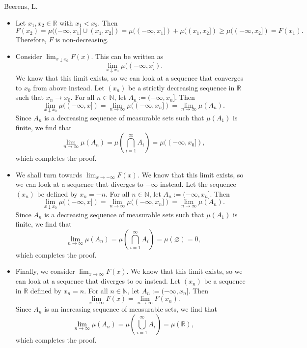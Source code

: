 \begin{solution}[3.11]{Beerens, L.}
    \begin{itemize}
        \item Let $x_1,x_2\in\mathbb{R}$ with $x_1<x_2$. Then
        $$
            F(x_2) = \mu((-\infty,x_1]\cup (x_1,x_2]) = \mu((-\infty, x_1]) + \mu((x_1,x_2])\geq\mu((-\infty, x_2]) = F(x_1).
        $$
        Therefore, $F$ is non-decreasing.
        
        \item Consider $\lim_{x\downarrow x_0}F(x)$. This can be written as 
        $$
            \lim_{x\downarrow x_0}\mu((-\infty,x]).
        $$
        We know that this limit exists, so we can look at a sequence that converges to $x_0$ from above instead. Let $(x_n)$ be a strictly decreasing sequence in $\mathbb{R}$ such that $x_n\rightarrow x_0$. For all $n\in\mathbb{N}$, let $A_n:=(-\infty,x_n]$. Then
        $$
            \lim_{x\downarrow x_0}\mu((-\infty,x]) = \lim_{n\rightarrow \infty}\mu((-\infty,x_n]) = \lim_{n\rightarrow \infty}\mu(A_n).
        $$
        Since $A_n$ is a decreasing sequence of measurable sets such that $\mu(A_1)$ is finite, we find that
        $$
            \lim_{n\rightarrow \infty}\mu(A_n) = \mu\left( \bigcap_{i=1}^\infty A_i \right) = \mu((-\infty, x_0]),
        $$
        which completes the proof.
        
        \item We shall turn towards $\lim_{x\rightarrow -\infty}F(x)$. We know that this limit exists, so we can look at a sequence that diverges to $-\infty$ instead. Let the sequence $(x_n)$ be defined by $x_n = -n$. For all $n\in\mathbb{N}$, let $A_n:=(-\infty,x_n]$. Then
        $$
            \lim_{x\downarrow x_0}\mu((-\infty,x]) = \lim_{n\rightarrow \infty}\mu((-\infty,x_n]) = \lim_{n\rightarrow \infty}\mu(A_n).
        $$
        Since $A_n$ is a decreasing sequence of measurable sets such that $\mu(A_1)$ is finite, we find that
        $$
            \lim_{n\rightarrow \infty}\mu(A_n) = \mu\left( \bigcap_{i=1}^\infty A_i \right) = \mu(\varnothing) = 0,
        $$
        which completes the proof.
        
        \item Finally, we consider $\lim_{x\rightarrow \infty}F(x)$. We know that this limit exists, so we can look at a sequence that diverges to $\infty$ instead. Let $(x_n)$ be a sequence in $\mathbb{R}$ defined by $x_n = n$. For all $n\in\mathbb{N}$, let $A_n:=(-\infty,x_n]$. Then
        $$
            \lim_{x\rightarrow \infty}F(x) = \lim_{n\rightarrow \infty}F(x_n).
        $$
        Since $A_n$ is an increasing sequence of measurable sets, we find that
        $$
            \lim_{n\rightarrow \infty}\mu(A_n) = \mu\left( \bigcup_{i=1}^\infty A_i \right) = \mu(\mathbb{R}),
        $$
        which completes the proof.
    \end{itemize}
\end{solution}

